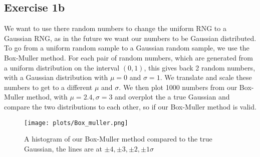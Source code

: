   \subsection{Exercise 1b}
  We want to use there random numbers to change the uniform RNG to a Gaussian RNG, as in the future we want our numbers to be Gaussian distributed. To go from a uniform random sample to a Gaussian random sample, we use the Box-Muller method. For each pair of random numbers, which are generated from a uniform distribution on the interval $(0,1)$, this gives back 2 random numbers, with a Gaussian distribution with $\mu=0$ and $\sigma=1$. We translate and scale these numbers to get to a different $\mu$ and $\sigma$. We then plot 1000 numbers from our Box-Muller method, with $\mu=2.4,\sigma=3$ and overplot the a true Gaussian and compare the two distributions to each other, so if our Box-Muller method is valid.
  \begin{figure}[h]
   \centering
   \texttt{[image: plots/Box\_muller.png]}
      \caption{A histogram of our Box-Muller method compared to the true Gaussian, the lines are at $\pm4,\pm3,\pm2,\pm1 \sigma$}
   \end{figure}
  
